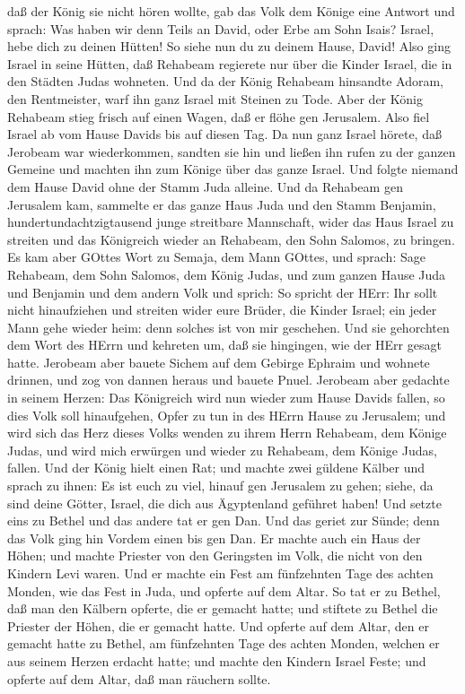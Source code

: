 daß der König sie nicht hören wollte, gab das Volk dem Könige eine
Antwort und sprach: Was haben wir denn Teils an David, oder Erbe am Sohn
Isais? Israel, hebe dich zu deinen Hütten! So siehe nun du zu deinem
Hause, David! Also ging Israel in seine Hütten,  daß
Rehabeam regierete nur über die Kinder Israel, die in den Städten Judas
wohneten.  Und da der König Rehabeam hinsandte Adoram, den
Rentmeister, warf ihn ganz Israel mit Steinen zu Tode. Aber der König
Rehabeam stieg frisch auf einen Wagen, daß er flöhe gen Jerusalem.
 Also fiel Israel ab vom Hause Davids bis auf diesen Tag.
 Da nun ganz Israel hörete, daß Jerobeam war wiederkommen,
sandten sie hin und ließen ihn rufen zu der ganzen Gemeine und machten
ihn zum Könige über das ganze Israel. Und folgte niemand dem Hause David
ohne der Stamm Juda alleine.  Und da Rehabeam gen Jerusalem
kam, sammelte er das ganze Haus Juda und den Stamm Benjamin,
hundertundachtzigtausend junge streitbare Mannschaft, wider das Haus
Israel zu streiten und das Königreich wieder an Rehabeam, den Sohn
Salomos, zu bringen.  Es kam aber GOttes Wort zu Semaja,
dem Mann GOttes, und sprach:  Sage Rehabeam, dem Sohn
Salomos, dem König Judas, und zum ganzen Hause Juda und Benjamin und dem
andern Volk und sprich:  So spricht der HErr: Ihr sollt
nicht hinaufziehen und streiten wider eure Brüder, die Kinder Israel;
ein jeder Mann gehe wieder heim: denn solches ist von mir geschehen. Und
sie gehorchten dem Wort des HErrn und kehreten um, daß sie hingingen,
wie der HErr gesagt hatte.  Jerobeam aber bauete Sichem auf
dem Gebirge Ephraim und wohnete drinnen, und zog von dannen heraus und
bauete Pnuel.  Jerobeam aber gedachte in seinem Herzen: Das
Königreich wird nun wieder zum Hause Davids fallen,  so
dies Volk soll hinaufgehen, Opfer zu tun in des HErrn Hause zu
Jerusalem; und wird sich das Herz dieses Volks wenden zu ihrem Herrn
Rehabeam, dem Könige Judas, und wird mich erwürgen und wieder zu
Rehabeam, dem Könige Judas, fallen.  Und der König hielt
einen Rat; und machte zwei güldene Kälber und sprach zu ihnen: Es ist
euch zu viel, hinauf gen Jerusalem zu gehen; siehe, da sind deine
Götter, Israel, die dich aus Ägyptenland geführet haben! 
Und setzte eins zu Bethel und das andere tat er gen Dan. 
Und das geriet zur Sünde; denn das Volk ging hin Vordem einen bis gen
Dan.  Er machte auch ein Haus der Höhen; und machte
Priester von den Geringsten im Volk, die nicht von den Kindern Levi
waren.  Und er machte ein Fest am fünfzehnten Tage des
achten Monden, wie das Fest in Juda, und opferte auf dem Altar. So tat
er zu Bethel, daß man den Kälbern opferte, die er gemacht hatte; und
stiftete zu Bethel die Priester der Höhen, die er gemacht hatte.
 Und opferte auf dem Altar, den er gemacht hatte zu Bethel,
am fünfzehnten Tage des achten Monden, welchen er aus seinem Herzen
erdacht hatte; und machte den Kindern Israel Feste; und opferte auf dem
Altar, daß man räuchern sollte.

